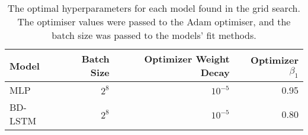 \begin{table}[H]
\centering
\begin{tabular}{lrrr}
\toprule
Model & Batch Size & Optimizer Weight Decay & Optimizer $\beta_1$ \\
\midrule
MLP & $2^{8}$ & $10^{-5}$ & 0.95 \\
BD-LSTM & $2^{8}$ & $10^{-5}$ & 0.80 \\
\bottomrule
\end{tabular}
\caption{The optimal hyperparameters for each model found in the grid search. The optimiser values were passed to the Adam optimiser, and the batch size was passed to the models' fit methods.}
\label{gsearch-res}
\end{table}
